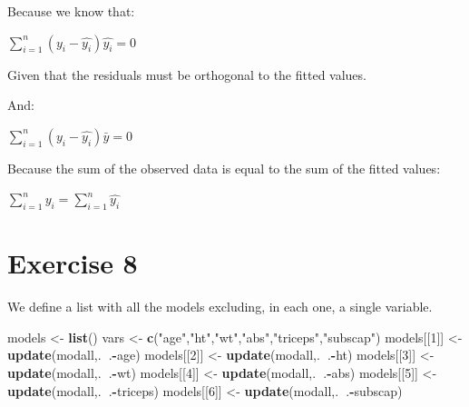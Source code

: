 \documentclass[]{article}
\newenvironment{Shaded}{\begin{snugshade}}{\end{snugshade}}
\newcommand{\DecValTok}[1]{\textcolor[rgb]{0.00,0.00,0.81}{#1}}
\newcommand{\KeywordTok}[1]{\textcolor[rgb]{0.13,0.29,0.53}{\textbf{#1}}}
\newcommand{\NormalTok}[1]{#1}
\newcommand{\OperatorTok}[1]{\textcolor[rgb]{0.81,0.36,0.00}{\textbf{#1}}}
\newcommand{\StringTok}[1]{\textcolor[rgb]{0.31,0.60,0.02}{#1}}
\begin{document}
Because we know that:

\(\sum_{i=1}^{n} (y_{i} - \hat{y_{i}}) \hat{y_{i}} = 0\)

Given that the residuals must be orthogonal to the fitted values.

And:

\(\sum_{i=1}^{n} (y_{i} - \hat{y_{i}}) \bar{y} = 0\)

Because the sum of the observed data is equal to the sum of the fitted
values:

\(\sum_{i=1}^{n} y_{i} = \sum_{i=1}^{n} \hat{y_{i}}\)

\newpage

\hypertarget{exercise-8}{%
\section{Exercise 8}\label{exercise-8}}

We define a list with all the models excluding, in each one, a single
variable.

\begin{Shaded}
\begin{Highlighting}[]
\NormalTok{models <-}\StringTok{ }\KeywordTok{list}\NormalTok{()}
\NormalTok{vars <-}\StringTok{ }\KeywordTok{c}\NormalTok{(}\StringTok{"age"}\NormalTok{,}\StringTok{"ht"}\NormalTok{,}\StringTok{"wt"}\NormalTok{,}\StringTok{"abs"}\NormalTok{,}\StringTok{"triceps"}\NormalTok{,}\StringTok{"subscap"}\NormalTok{)}
\NormalTok{models[[}\DecValTok{1}\NormalTok{]] <-}\StringTok{ }\KeywordTok{update}\NormalTok{(modall,.}\OperatorTok{~}\NormalTok{.}\OperatorTok{-}\NormalTok{age)}
\NormalTok{models[[}\DecValTok{2}\NormalTok{]] <-}\StringTok{ }\KeywordTok{update}\NormalTok{(modall,.}\OperatorTok{~}\NormalTok{.}\OperatorTok{-}\NormalTok{ht)}
\NormalTok{models[[}\DecValTok{3}\NormalTok{]] <-}\StringTok{ }\KeywordTok{update}\NormalTok{(modall,.}\OperatorTok{~}\NormalTok{.}\OperatorTok{-}\NormalTok{wt)}
\NormalTok{models[[}\DecValTok{4}\NormalTok{]] <-}\StringTok{ }\KeywordTok{update}\NormalTok{(modall,.}\OperatorTok{~}\NormalTok{.}\OperatorTok{-}\NormalTok{abs)}
\NormalTok{models[[}\DecValTok{5}\NormalTok{]] <-}\StringTok{ }\KeywordTok{update}\NormalTok{(modall,.}\OperatorTok{~}\NormalTok{.}\OperatorTok{-}\NormalTok{triceps)}
\NormalTok{models[[}\DecValTok{6}\NormalTok{]] <-}\StringTok{ }\KeywordTok{update}\NormalTok{(modall,.}\OperatorTok{~}\NormalTok{.}\OperatorTok{-}\NormalTok{subscap)}
\end{Highlighting}
\end{Shaded}
\end{document}
